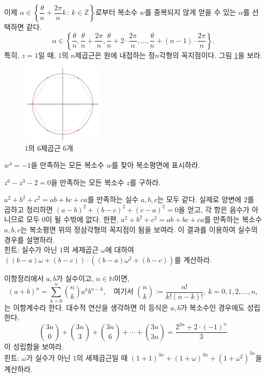 이제 $\alpha \in \left\{ \dfrac{\theta}{n}+ \dfrac{2\pi}{n}k \,:\, k\in\mathbb Z \right\}$로부터
복소수 $w$를 중복되지 않게 얻을 수 있는 $\alpha$를 선택하면 같다.
$$
\alpha \in \left\{
\dfrac\theta n,  \dfrac\theta n+ \dfrac{2\pi}n, \dfrac\theta n + 2\cdot \dfrac{2\pi}n, \ldots,
\dfrac\theta n+ (n-1)\cdot \dfrac{2\pi}n
\right\}.
$$
특히, $z=1$일 때, $1$의 $n$제곱근은 원에 내접하는 정$n$각형의 꼭지점이다.
그림 \ref{fig-1-8}을 보라.
\begin{figure}[!h]
\begin{center}
\includegraphics[width=0.35\textwidth]{./SaltChapter/figs/fig-1-8}
\end{center}
\caption{$1$의 $6$제곱근 $6$개}
\label{fig-1-8}
\end{figure}

\begin{salt_exercise} \label{ex-1-9}
$w^4=-1$을 만족하는 모든 복소수 $w$를 찾아
복소평면에 표시하라.
\end{salt_exercise}

\begin{salt_exercise} \label{ex-1-10}
$z^6-z^3-2=0$을 만족하는 모든 복소수 $z$를 구하라.
\end{salt_exercise}

\begin{salt_exercise} \label{ex-1-11}
$a^2+b^2+c^2= ab+bc+ca$를 만족하는 실수 $a,b,c$는 모두 같다.
실제로 양변에 $2$를 곱하고 정리하면
$(a-b)^2+(b-c)^2+(c-a)^2=0$을 얻고, 
각 항은 음수가 아니므로 모두 $0$이 될 수밖에 없다.
한편, $a^2+b^2+c^2= ab+bc+ca$를 만족하는 복소수 $a,b,c$는
복소평면 위의 정삼각형의 꼭지점이 됨을 보여라.
이 결과를 이용하여 실수의 경우를 설명하라. \\[1ex]
힌트: 실수가 아닌 $1$의 세제곱근 $\omega$에 대하여
$((b-a)\omega + (b-c))\cdot((b-a)\omega^2 + (b-c))$를 계산하라.
\end{salt_exercise}

\begin{salt_exercise} \label{ex-1-12}
이항정리에서
$a,b$가 실수이고, $n\in\mathbb N$이면,
$$
(a+b)^n = \sum_{k=0}^n {n \choose k}a^kb^{n-k},
\quad
\text{여기서 }
{n \choose k} := \frac{n!}{k!(n-k)!}, \
k=0,1,2,\ldots, n,
$$
는 이항계수라 한다.
대수적 연산을 생각하면 이 등식은 $a,b$가 복소수인 경우에도 성립한다.
$$
{3n \choose 0} + {3n \choose 3} + {3n \choose 6} + \cdots
+ {3n \choose 3n} = \dfrac{2^{3n} + 2\cdot(-1)^n}3
$$
이 성립함을 보여라. \\[1ex]
힌트: $\omega$가 실수가 아닌 $1$의 세제곱근일 때
$(1+1)^{3n} + (1+\omega)^{3n} + (1+\omega^2)^{3n}$을 계산하라.
\end{salt_exercise}


